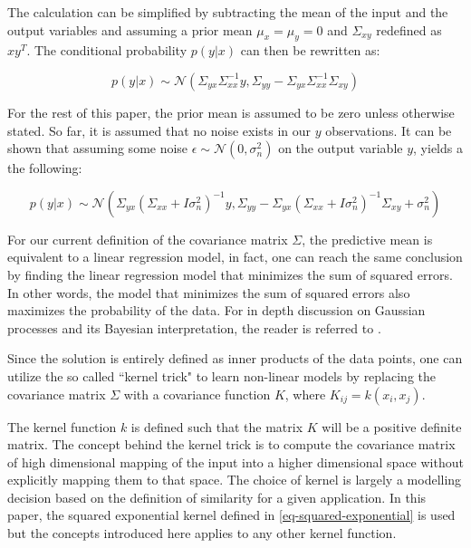 \documentclass[useAMS,usenatbib,fleqn]{mn2e}
\begin{document}
The calculation can be simplified by subtracting the mean of the input and the output variables and assuming a prior mean $\mu_{x}=\mu_{y}=0$ and $\Sigma_{xy}$ redefined as $xy^{T}$. The conditional probability $p(y|x)$ can then be rewritten as:

\begin{equation}
\label{eq-conditional-zero-mean}
p(y|x) \sim  \mathcal{N} \left ( \Sigma_{yx}\Sigma_{xx}^{-1}y, \Sigma_{yy}-\Sigma_{yx}\Sigma_{xx}^{-1}\Sigma_{xy}\right )
\end{equation}

For the rest of this paper, the prior mean is assumed to be zero unless otherwise stated. So far, it is assumed that no noise exists in our $y$ observations. It can be shown that assuming some noise $\epsilon \sim \mathcal{N}\left(0,\sigma_{n}^{2}\right)$ on the output variable $y$, yields a the following:

\begin{equation}
\label{eq-mean-variance-noise}
p(y|x) \sim  \mathcal{N} \left ( \Sigma_{yx}\left(\Sigma_{xx}+I\sigma_{n}^{2}\right)^{-1}y, \Sigma_{yy}-\Sigma_{yx}\left(\Sigma_{xx}+I\sigma_{n}^{2}\right)^{-1}\Sigma_{xy}+\sigma_{n}^{2}\right )
\end{equation}

For our current definition of the covariance matrix $\Sigma$, the predictive mean is equivalent to a linear regression model, in fact, one can reach the same conclusion by finding the linear regression model that minimizes the sum of squared errors. In other words, the model that minimizes the sum of squared errors also maximizes the probability of the data. For in depth discussion on Gaussian processes and its Bayesian interpretation, the reader is referred to \cite{}.

Since the solution is entirely defined as inner products of the data points, one can utilize the so called ``kernel trick" to learn non-linear models by replacing the covariance matrix $\Sigma$ with a covariance function $K$, where $K_{ij} = k(x_{i},x_{j})$.

The kernel function $k$ is defined such that the matrix $K$ will be a positive definite matrix. The concept behind the kernel trick is to compute the covariance matrix of high dimensional mapping of the input into a higher dimensional space without explicitly mapping them to that space. The choice of kernel is largely a modelling decision based on the definition of similarity for a given application. In this paper, the squared exponential kernel defined in \eqref{eq-squared-exponential} is used but the concepts introduced here applies to any other kernel function.
\end{document}
